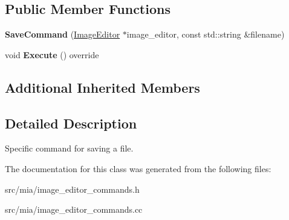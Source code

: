\subsection*{Public Member Functions}
\begin{DoxyCompactItemize}
\item 
\mbox{\label{classimage__tools_1_1SaveCommand_a1efb4a2eb98afe5030a06985a958ef6c}} 
{\bfseries Save\+Command} (\hyperlink{classimage__tools_1_1ImageEditor}{Image\+Editor} $\ast$image\+\_\+editor, const std\+::string \&filename)
\item 
\mbox{\label{classimage__tools_1_1SaveCommand_aec8f2506ee25ce6681c0ba6ab312d10e}} 
void {\bfseries Execute} () override
\end{DoxyCompactItemize}
\subsection*{Additional Inherited Members}


\subsection{Detailed Description}
Specific command for saving a file. 

The documentation for this class was generated from the following files\+:\begin{DoxyCompactItemize}
\item 
src/mia/image\+\_\+editor\+\_\+commands.\+h\item 
src/mia/image\+\_\+editor\+\_\+commands.\+cc\end{DoxyCompactItemize}
